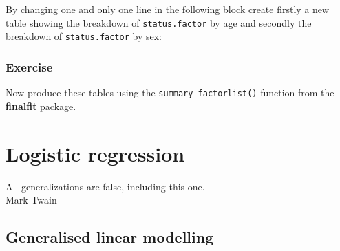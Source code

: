 \documentclass[
  12pt,
  krantz2]{krantz}
\makeatletter
\newenvironment{Shaded}{\begin{snugshade}}{\end{snugshade}}
\newcommand{\DataTypeTok}[1]{\textcolor[rgb]{0.13,0.29,0.53}{#1}}
\newcommand{\DecValTok}[1]{\textcolor[rgb]{0.00,0.00,0.81}{#1}}
\newcommand{\KeywordTok}[1]{\textcolor[rgb]{0.13,0.29,0.53}{\textbf{#1}}}
\newcommand{\NormalTok}[1]{#1}
\newcommand{\OperatorTok}[1]{\textcolor[rgb]{0.81,0.36,0.00}{\textbf{#1}}}
\newcommand{\StringTok}[1]{\textcolor[rgb]{0.31,0.60,0.02}{#1}}
\renewenvironment{quote}{\begin{VF}}{\end{VF}}
\newenvironment{kframe}{%
\medskip{}
\setlength{\fboxsep}{.8em}
 \def\at@end@of@kframe{}%
 \ifinner\ifhmode%
  \def\at@end@of@kframe{\end{minipage}}%
  \begin{minipage}{\columnwidth}%
 \fi\fi%
 \def\FrameCommand##1{\hskip\@totalleftmargin \hskip-\fboxsep
 \colorbox{shadecolor}{##1}\hskip-\fboxsep
     \hskip-\linewidth \hskip-\@totalleftmargin \hskip\columnwidth}%
 \MakeFramed {\advance\hsize-\width
   \@totalleftmargin\z@ \linewidth\hsize
   \@setminipage}}%
 {\par\unskip\endMakeFramed%
 \at@end@of@kframe}
\renewenvironment{Shaded}{\begin{kframe}}{\end{kframe}}
\makeatother
\begin{document}
By changing one and only one line in the following block create firstly a new table showing the breakdown of \texttt{status.factor} by age and secondly the breakdown of \texttt{status.factor} by sex:

\begin{Shaded}
\end{Shaded}

\hypertarget{chap08-ex3}{%
\subsection{Exercise}\label{chap08-ex3}}

Now produce these tables using the \texttt{summary\_factorlist()} function from the \textbf{finalfit} package.

\hypertarget{chap09-h1}{%
\chapter{Logistic regression}\label{chap09-h1}}


\begin{quote}
All generalizations are false, including this one.\\
Mark Twain
\end{quote}

\hypertarget{generalised-linear-modelling}{%
\section{Generalised linear modelling}\label{generalised-linear-modelling}}
\end{document}
